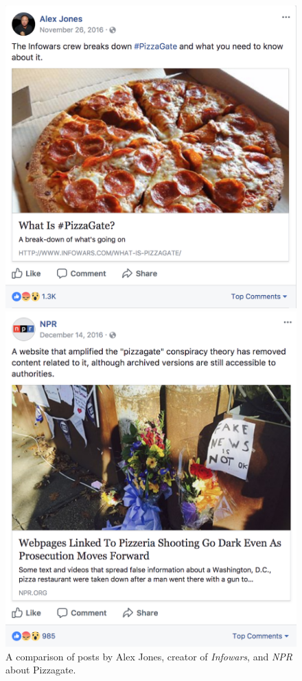 \documentclass[12pt]{article}
\begin{document}
\begin{figure}[h]
	\begin{minipage}{0.48\textwidth}
		\centering
		\includegraphics[scale=.3]{pizzagate_alex_jones_fb}
	\end{minipage}
	\begin{minipage}{0.48\textwidth}
		\centering
		\includegraphics[scale=.3]{pizzagate_npr_fb}
	\end{minipage}
	\caption{A comparison of posts by Alex Jones, creator of {\it Infowars}, \citep{alex_jones_pizzagate_post} and {\it NPR} \citep{npr_pizzagate_post} about Pizzagate.}
\end{figure}
\end{document}

